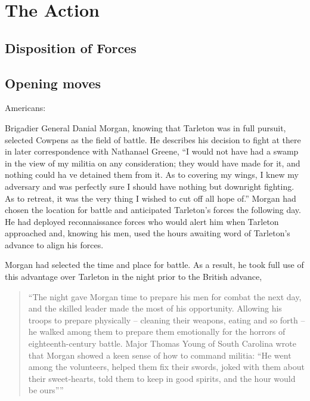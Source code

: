 \section{The Action}

\subsection{Disposition of Forces}

\subsection{Opening moves}

Americans:

Brigadier General Danial Morgan, knowing that Tarleton was in full pursuit,
selected Cowpens as the field of battle. He describes his decision to fight at
there in later correspondence with Nathanael Greene, ``I would not have had a
swamp in the view of my militia on any consideration; they would have made for
it, and nothing could ha ve detained them from it. As to covering my wings, I
knew my adversary and was perfectly sure I should have nothing but downright
fighting. As to retreat, it was the very thing I wished to cut off all hope of.''
\cite[46]{moncure_cowpens_1996} Morgan had chosen the location for battle and anticipated
Tarleton's forces the following day. He had deployed reconnaissance forces who
would alert him when Tarleton approached and, knowing his men, used the hours
awaiting word of Tarleton's advance to align his forces.

Morgan had selected the time and place for battle. As a result, he took full
use of this advantage over Tarleton in the night prior to the British advance,

\begin{quote}
  ``The night gave Morgan time to prepare his men for combat the next day, and
  the skilled leader made the most of his opportunity. Allowing his troops to
  prepare physically -- cleaning their weapons, eating and so forth -- he walked
  among them to prepare them emotionally for the horrors of eighteenth-century
  battle. Major Thomas Young of South Carolina wrote that Morgan showed a keen
  sense of how to command militia: ``He went among the volunteers, helped them
  fix their swords, joked with them about their sweet-hearts, told them to keep
  in good spirits, and the hour would be ours'''' \cite[47]{moncure_cowpens_1996}
\end{quote}

